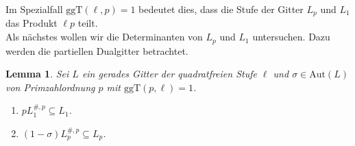 \documentclass[12pt,a4paper,halfparskip,headsepline,bibtotocnumbered]{scrreprt}
\theoremstyle{nummermitklammern}
\newtheorem{lemma}[defsatzusw]{Lemma}
\theoremstyle{nonumberbreak}
\begin{document}
Im Spezialfall $\text{ggT}(\ell, p) = 1$ bedeutet dies, dass die Stufe der Gitter $L_p$ und $L_1$ das Produkt $\ell p$ teilt.\\
Als nächstes wollen wir die Determinanten von $L_p$ und $L_1$ untersuchen. Dazu werden die partiellen Dualgitter betrachtet.

\begin{framed}
	\begin{lemma}\label{lem:fpinc}
		Sei $L$ ein gerades Gitter der quadratfreien Stufe $\ell$ und $\sigma \in \text{Aut}(L)$ von Primzahlordnung $p$ mit $\text{ggT}(p, \ell) = 1$.
		\begin{enumerate}[label=(\roman*)]
			\item $p L_1^{\#,p} \subseteq L_1$.
			\item $(1 - \sigma)L_p^{\#,p} \subseteq L_p$.
		\end{enumerate}
	\end{lemma}
\end{framed}
\end{document}
